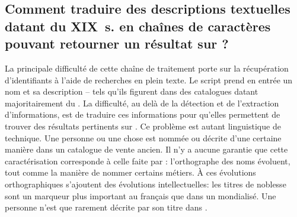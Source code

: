 \subsection{Comment traduire des descriptions textuelles datant du XIX~s. en chaînes de caractères pouvant retourner un résultat sur \wkd{}?} 
La principale difficulté de cette chaîne de traitement porte sur la récupération d'identifiants \wkd{} à l'aide de recherches en plein texte. Le script prend en entrée un nom et sa description -- tels qu'ils figurent dans des catalogues datant majoritairement du . La difficulté, au delà de la détection et de l'extraction d'informations, est de traduire ces informations pour qu'elles permettent de trouver des résultats pertinents sur \wkd{}. Ce problème est autant linguistique de technique. Une personne ou une chose est nommée ou décrite d'une certaine manière dans un catalogue de vente ancien. Il n'y a aucune garantie que cette caractérisation corresponde à celle faite par \wkd{}: l'orthographe des noms évoluent, tout comme la manière de nommer certains métiers. À ces évolutions orthographiques s'ajoutent des évolutions intellectuelles: les titres de noblesse sont un marqueur plus important au  français que dans un  mondialisé. Une personne n'est que rarement décrite par son titre dans \wkd{}. 

